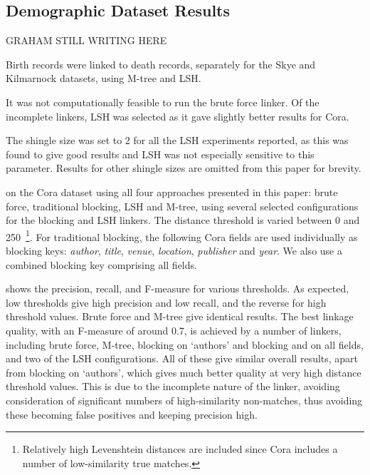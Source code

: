 \documentclass{llncs}
\begin{document}

\subsection{Demographic Dataset Results}

GRAHAM STILL WRITING HERE

Birth records were linked to death records, separately for the Skye and Kilmarnock datasets, using M-tree and LSH.

It was not computationally feasible to run the brute force linker. Of the incomplete linkers, LSH was selected as it gave slightly better results for Cora.

The shingle size was set to 2 for all the LSH experiments reported, as this was found to give good results and LSH was not especially sensitive to this parameter. Results for other shingle sizes are omitted from this paper for brevity. 





on the Cora dataset using all four
approaches presented in this paper: brute force, traditional blocking,
LSH and M-tree, using several selected configurations for the blocking
and LSH linkers. The distance threshold is varied between 0 and
250~\footnote{Relatively high Levenshtein distances are included since
Cora includes a number of low-similarity true matches.}. For traditional
blocking, the following Cora fields are used individually as blocking
keys: \textit{author}, \textit{title}, \textit{venue},
\textit{location}, \textit{publisher} and \textit{year}. We also use a
combined blocking key comprising all fields.

 shows the precision, recall, and F-measure for
various thresholds. As expected, low thresholds give high precision and
low recall, and the reverse for high threshold values. Brute force and
M-tree give identical results. The best linkage quality, with an
F-measure of around 0.7, is achieved by a number of linkers, including
brute force, M-tree, blocking on `authors' and blocking and on all
fields, and two of the LSH configurations. All of these give similar
overall results, apart from blocking on `authors', which gives much
better quality at very high distance threshold values. This is due to
the incomplete nature of the linker, avoiding consideration of
significant numbers of high-similarity non-matches, thus avoiding these
becoming false positives and keeping precision high.
\end{document}
